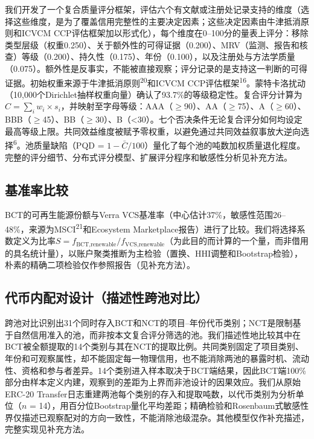 \documentclass[12pt,a4paper]{article}
\begin{document}
我们开发了一个复合质量评分框架，评估六个有文献或注册处记录支持的维度（选择这些维度，是为了覆盖信用完整性的主要决定因素；这些决定因素由牛津抵消原则和ICVCM CCP评估框架加以形式化），每个维度在0--100分的量表上评分：移除类型层级（权重0.250）、关于额外性的可得证据（0.200）、MRV（监测、报告和核查）等级（0.200）、持久性（0.175）、年份（0.100），以及注册处与方法学质量（0.075）。额外性是反事实，不能被直接观察；评分记录的是支持这一判断的可得证据。初始权重来源于牛津抵消原则\textsuperscript{20}和ICVCM CCP评估框架\textsuperscript{16}。蒙特卡洛扰动（10,000个Dirichlet抽样权重向量）确认了93.7\%的等级稳定性。复合评分计算为$C = \sum_{i} w_i \times s_i$，并映射至字母等级：AAA（$\geq$90）、AA（$\geq$75）、A（$\geq$60）、BBB（$\geq$45）、BB（$\geq$30）、B（<30）。七个否决条件无论复合评分如何均设定最高等级上限。共同效益维度被赋予零权重，以避免通过共同效益叙事放大逆向选择\textsuperscript{6}。池质量缺陷（PQD = $1 - \bar{C}/100$）量化了每个池的吨数加权质量退化程度。完整的评分细节、分布式评分模型、扩展评分程序和敏感性分析见补充方法。

\subsection*{基准率比较}

BCT的可再生能源份额与Verra VCS基准率（中心估计37\%，敏感性范围26--48\%，来源为MSCI\textsuperscript{21}和Ecosystem Marketplace报告）进行了比较。我们将选择系数定义为比率$S = f_{\text{BCT,renewable}} / f_{\text{VCS,renewable}}$（为此目的而计算的一个量，而非借用的具名统计量），以账户聚类推断为主检验（置换、HHI调整和Bootstrap检验），朴素的精确二项检验仅作参照报告（见补充方法）。

\subsection*{代币内配对设计（描述性跨池对比）}

跨池对比识别出31个同时存入BCT和NCT的项目--年份代币类别；NCT是限制基于自然信用准入的池，而非按本文复合评分筛选的池。我们描述性地比较其中在BCT被全额提取的14个类别与其在NCT的提取比例。共同类别固定了项目类别、年份和可观察属性，却不能固定每一物理信用，也不能消除两池的暴露时机、流动性、资格和参与者差异。14个类别进入样本取决于BCT端结果，因此BCT端100\%部分由样本定义内建，观察到的差距为上界而非池设计的因果效应。我们从原始ERC-20 Transfer日志重建两池每个类别的存入和提取吨数，以代币类别为分析单位（$n$ = 14），用百分位Bootstrap量化平均差距；精确检验和Rosenbaum式敏感性界仅描述已观察配对的方向一致性，不能消除池级混杂。其他模型仅作补充描述，完整实现见补充方法。
\end{document}
